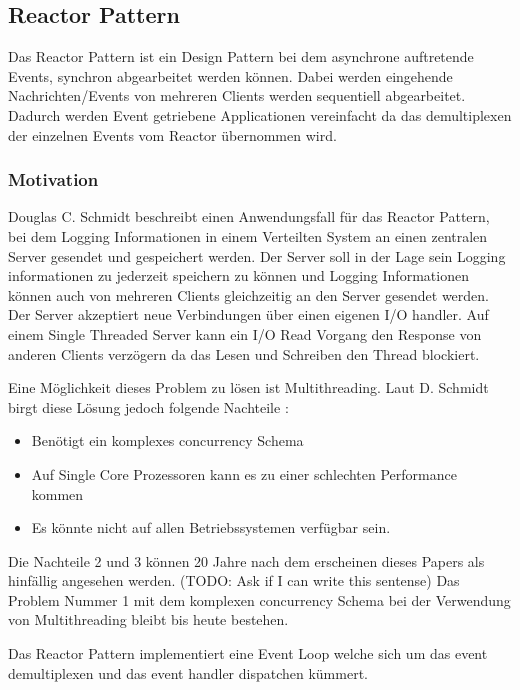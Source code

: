 \subsection{Reactor Pattern}
\label{section:Reactor Pattern}

Das Reactor Pattern ist ein Design Pattern bei dem asynchrone auftretende Events, synchron abgearbeitet werden können. Dabei werden eingehende Nachrichten/Events von mehreren Clients werden sequentiell abgearbeitet. Dadurch werden Event getriebene Applicationen vereinfacht da das demultiplexen der einzelnen Events vom Reactor übernommen wird. \cite[p. 1]{Sch95}


\subsubsection{Motivation}

Douglas C. Schmidt beschreibt einen Anwendungsfall für das Reactor Pattern, bei dem Logging Informationen in einem Verteilten System an einen zentralen Server gesendet und gespeichert werden. Der Server soll in der Lage sein Logging informationen zu jederzeit speichern zu können und Logging Informationen können auch von mehreren Clients gleichzeitig an den Server gesendet werden. Der Server akzeptiert neue Verbindungen über einen eigenen I/O handler. Auf einem Single Threaded Server kann ein I/O Read Vorgang den Response von anderen Clients verzögern da das Lesen und Schreiben den Thread blockiert. \cite[p. 1]{Sch95}

Eine Möglichkeit dieses Problem zu lösen ist Multithreading. Laut D. Schmidt birgt diese Lösung jedoch folgende Nachteile \cite[p. 2]{Sch95}:

\begin{itemize}
  \item Benötigt ein komplexes concurrency Schema
  \item Auf Single Core Prozessoren kann es zu einer schlechten Performance kommen
  \item Es könnte nicht auf allen Betriebssystemen verfügbar sein. 
\end{itemize}

Die Nachteile 2 und 3 können 20 Jahre nach dem erscheinen dieses Papers als hinfällig angesehen werden. (TODO: Ask if I can write this sentense) Das Problem Nummer 1 mit dem komplexen concurrency Schema bei der Verwendung von Multithreading bleibt bis heute bestehen. 

Das Reactor Pattern implementiert eine Event Loop welche sich um das event demultiplexen und das event handler dispatchen kümmert. 

